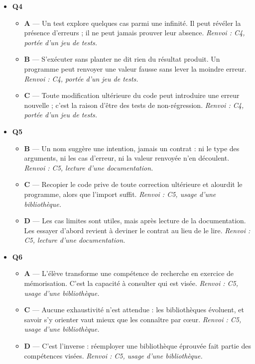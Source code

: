 \begin{itemize}
\begin{itemize}
  \end{itemize}
  \item \textbf{Q4}
  \begin{itemize}
    \item \textbf{A} — Un test explore quelques cas parmi une infinité. Il peut révéler la présence d'erreurs ; il ne peut jamais prouver leur absence. \emph{Renvoi : C4, portée d'un jeu de tests.}
    \item \textbf{B} — S'exécuter sans planter ne dit rien du résultat produit. Un programme peut renvoyer une valeur fausse sans lever la moindre erreur. \emph{Renvoi : C4, portée d'un jeu de tests.}
    \item \textbf{C} — Toute modification ultérieure du code peut introduire une erreur nouvelle ; c'est la raison d'être des tests de non-régression. \emph{Renvoi : C4, portée d'un jeu de tests.}
  \end{itemize}
  \item \textbf{Q5}
  \begin{itemize}
    \item \textbf{B} — Un nom suggère une intention, jamais un contrat : ni le type des arguments, ni les cas d'erreur, ni la valeur renvoyée n'en découlent. \emph{Renvoi : C5, lecture d'une documentation.}
    \item \textbf{C} — Recopier le code prive de toute correction ultérieure et alourdit le programme, alors que l'import suffit. \emph{Renvoi : C5, usage d'une bibliothèque.}
    \item \textbf{D} — Les cas limites sont utiles, mais après lecture de la documentation. Les essayer d'abord revient à deviner le contrat au lieu de le lire. \emph{Renvoi : C5, lecture d'une documentation.}
  \end{itemize}
  \item \textbf{Q6}
  \begin{itemize}
    \item \textbf{A} — L'élève transforme une compétence de recherche en exercice de mémorisation. C'est la capacité à consulter qui est visée. \emph{Renvoi : C5, usage d'une bibliothèque.}
    \item \textbf{C} — Aucune exhaustivité n'est attendue : les bibliothèques évoluent, et savoir s'y orienter vaut mieux que les connaître par cœur. \emph{Renvoi : C5, usage d'une bibliothèque.}
    \item \textbf{D} — C'est l'inverse : réemployer une bibliothèque éprouvée fait partie des compétences visées. \emph{Renvoi : C5, usage d'une bibliothèque.}

\end{itemize}
\end{itemize}
